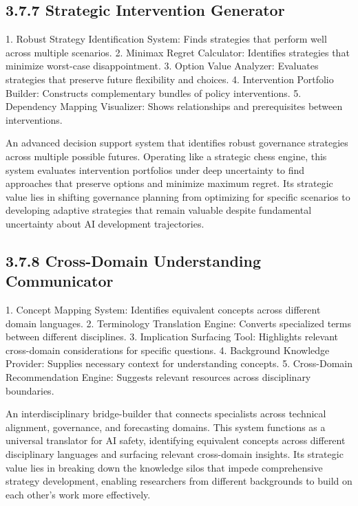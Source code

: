 \documentclass[
  11pt,
  letterpaper,
]{book}
\begin{document}
\subsection*{3.7.7 Strategic Intervention
Generator}\label{strategic-intervention-generator}

1. Robust Strategy Identification System: Finds strategies that perform
well across multiple scenarios. 2. Minimax Regret Calculator: Identifies
strategies that minimize worst-case disappointment. 3. Option Value
Analyzer: Evaluates strategies that preserve future flexibility and
choices. 4. Intervention Portfolio Builder: Constructs complementary
bundles of policy interventions. 5. Dependency Mapping Visualizer: Shows
relationships and prerequisites between interventions.

An advanced decision support system that identifies robust governance
strategies across multiple possible futures. Operating like a strategic
chess engine, this system evaluates intervention portfolios under deep
uncertainty to find approaches that preserve options and minimize
maximum regret. Its strategic value lies in shifting governance planning
from optimizing for specific scenarios to developing adaptive strategies
that remain valuable despite fundamental uncertainty about AI
development trajectories.

\subsection*{\texorpdfstring{3.7.8 \textbf{Cross-Domain Understanding
Communicator}}{3.7.8 Cross-Domain Understanding Communicator}}\label{cross-domain-understanding-communicator}

1. Concept Mapping System: Identifies equivalent concepts across
different domain languages. 2. Terminology Translation Engine: Converts
specialized terms between different disciplines. 3. Implication
Surfacing Tool: Highlights relevant cross-domain considerations for
specific questions. 4. Background Knowledge Provider: Supplies necessary
context for understanding concepts. 5. Cross-Domain Recommendation
Engine: Suggests relevant resources across disciplinary boundaries.

An interdisciplinary bridge-builder that connects specialists across
technical alignment, governance, and forecasting domains. This system
functions as a universal translator for AI safety, identifying
equivalent concepts across different disciplinary languages and
surfacing relevant cross-domain insights. Its strategic value lies in
breaking down the knowledge silos that impede comprehensive strategy
development, enabling researchers from different backgrounds to build on
each other's work more effectively.
\end{document}
